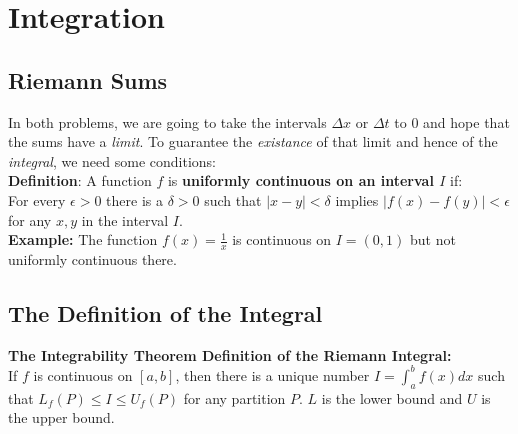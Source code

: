 \section{Integration}

    \subsection{Riemann Sums}

        In both problems, we are going to take the intervals $\Delta x$ or $\Delta t$ to 0 and hope that the sums have a \textit{limit}. To guarantee the \textit{existance} of that limit and hence of the \textit{integral},
        we need some conditions: \\

        \textbf{Definition}: A function $f$ is \textbf{uniformly continuous on an interval $I$} if: \\
        For every $\epsilon > 0$ there is a $\delta > 0$ such that $|x-y|<\delta$ implies $|f(x)-f(y)|<\epsilon$ for any $x,y$ in the interval $I$. \\

        \textbf{Example:} The function $f(x)=\frac{1}{x}$ is continuous on $I=(0,1)$ but not uniformly continuous there. \\

    \subsection{The Definition of the Integral}

        \textbf{The Integrability Theorem Definition of the Riemann Integral:} \\
        If $f$ is continuous on $[a,b]$, then there is a unique number $I = \int^b_a f(x)dx$ such that $L_f (P) \leq I \leq U_f (P)$ for any partition $P$. $L$ is the lower bound and $U$ is the upper bound. \\

